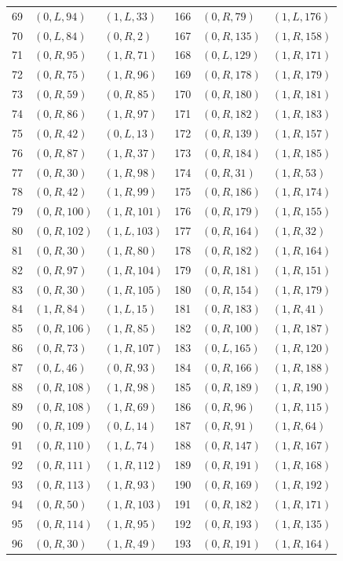 \begin{longtable}{r@{\quad}ll@{\qquad}r@{\quad}ll}
69 & $(0,L,94)$ & $(1,L,33)$ & 166 & $(0,R,79)$ & $(1,L,176)$\\
70 & $(0,L,84)$ & $(0,R,2)$ & 167 & $(0,R,135)$ & $(1,R,158)$\\
71 & $(0,R,95)$ & $(1,R,71)$ & 168 & $(0,L,129)$ & $(1,R,171)$\\
72 & $(0,R,75)$ & $(1,R,96)$ & 169 & $(0,R,178)$ & $(1,R,179)$\\
73 & $(0,R,59)$ & $(0,R,85)$ & 170 & $(0,R,180)$ & $(1,R,181)$\\
74 & $(0,R,86)$ & $(1,R,97)$ & 171 & $(0,R,182)$ & $(1,R,183)$\\
75 & $(0,R,42)$ & $(0,L,13)$ & 172 & $(0,R,139)$ & $(1,R,157)$\\
76 & $(0,R,87)$ & $(1,R,37)$ & 173 & $(0,R,184)$ & $(1,R,185)$\\
77 & $(0,R,30)$ & $(1,R,98)$ & 174 & $(0,R,31)$ & $(1,R,53)$\\
78 & $(0,R,42)$ & $(1,R,99)$ & 175 & $(0,R,186)$ & $(1,R,174)$\\
79 & $(0,R,100)$ & $(1,R,101)$ & 176 & $(0,R,179)$ & $(1,R,155)$\\
80 & $(0,R,102)$ & $(1,L,103)$ & 177 & $(0,R,164)$ & $(1,R,32)$\\
81 & $(0,R,30)$ & $(1,R,80)$ & 178 & $(0,R,182)$ & $(1,R,164)$\\
82 & $(0,R,97)$ & $(1,R,104)$ & 179 & $(0,R,181)$ & $(1,R,151)$\\
83 & $(0,R,30)$ & $(1,R,105)$ & 180 & $(0,R,154)$ & $(1,R,179)$\\
84 & $(1,R,84)$ & $(1,L,15)$ & 181 & $(0,R,183)$ & $(1,R,41)$\\
85 & $(0,R,106)$ & $(1,R,85)$ & 182 & $(0,R,100)$ & $(1,R,187)$\\
86 & $(0,R,73)$ & $(1,R,107)$ & 183 & $(0,L,165)$ & $(1,R,120)$\\
87 & $(0,L,46)$ & $(0,R,93)$ & 184 & $(0,R,166)$ & $(1,R,188)$\\
88 & $(0,R,108)$ & $(1,R,98)$ & 185 & $(0,R,189)$ & $(1,R,190)$\\
89 & $(0,R,108)$ & $(1,R,69)$ & 186 & $(0,R,96)$ & $(1,R,115)$\\
90 & $(0,R,109)$ & $(0,L,14)$ & 187 & $(0,R,91)$ & $(1,R,64)$\\
91 & $(0,R,110)$ & $(1,L,74)$ & 188 & $(0,R,147)$ & $(1,R,167)$\\
92 & $(0,R,111)$ & $(1,R,112)$ & 189 & $(0,R,191)$ & $(1,R,168)$\\
93 & $(0,R,113)$ & $(1,R,93)$ & 190 & $(0,R,169)$ & $(1,R,192)$\\
94 & $(0,R,50)$ & $(1,R,103)$ & 191 & $(0,R,182)$ & $(1,R,171)$\\
95 & $(0,R,114)$ & $(1,R,95)$ & 192 & $(0,R,193)$ & $(1,R,135)$\\
96 & $(0,R,30)$ & $(1,R,49)$ & 193 & $(0,R,191)$ & $(1,R,164)$\\
\end{longtable}
\normalsize
\clearpage
